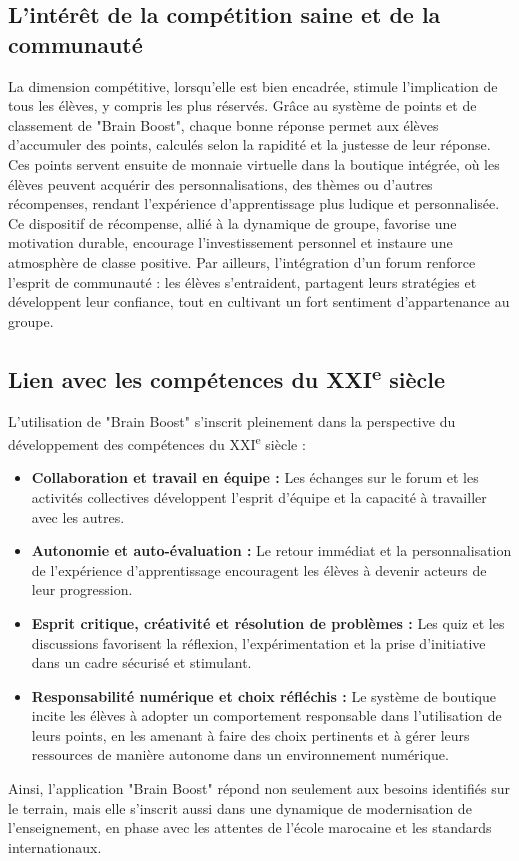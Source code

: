 \documentclass[a4paper,11pt]{report}
\begin{document}
\subsection{L'intérêt de la compétition saine et de la communauté}
La dimension compétitive, lorsqu'elle est bien encadrée, stimule l'implication de tous les élèves, y compris les plus réservés. Grâce au système de points et de classement de "Brain Boost", chaque bonne réponse permet aux élèves d'accumuler des points, calculés selon la rapidité et la justesse de leur réponse. Ces points servent ensuite de monnaie virtuelle dans la boutique intégrée, où les élèves peuvent acquérir des personnalisations, des thèmes ou d'autres récompenses, rendant l'expérience d'apprentissage plus ludique et personnalisée. Ce dispositif de récompense, allié à la dynamique de groupe, favorise une motivation durable, encourage l'investissement personnel et instaure une atmosphère de classe positive. Par ailleurs, l'intégration d'un forum renforce l'esprit de communauté : les élèves s'entraident, partagent leurs stratégies et développent leur confiance, tout en cultivant un fort sentiment d'appartenance au groupe.

\subsection{Lien avec les compétences du XXI\textsuperscript{e} siècle}
L'utilisation de "Brain Boost" s'inscrit pleinement dans la perspective du développement des compétences du XXI\textsuperscript{e} siècle :
\begin{itemize}
    \item \textbf{Collaboration et travail en équipe :} Les échanges sur le forum et les activités collectives développent l'esprit d'équipe et la capacité à travailler avec les autres.
    \item \textbf{Autonomie et auto-évaluation :} Le retour immédiat et la personnalisation de l'expérience d'apprentissage encouragent les élèves à devenir acteurs de leur progression.
    \item \textbf{Esprit critique, créativité et résolution de problèmes :} Les quiz et les discussions favorisent la réflexion, l'expérimentation et la prise d'initiative dans un cadre sécurisé et stimulant.
    \item \textbf{Responsabilité numérique et choix réfléchis :} Le système de boutique incite les élèves à adopter un comportement responsable dans l'utilisation de leurs points, en les amenant à faire des choix pertinents et à gérer leurs ressources de manière autonome dans un environnement numérique.
\end{itemize}
Ainsi, l'application "Brain Boost" répond non seulement aux besoins identifiés sur le terrain, mais elle s'inscrit aussi dans une dynamique de modernisation de l'enseignement, en phase avec les attentes de l'école marocaine et les standards internationaux.
\end{document}
